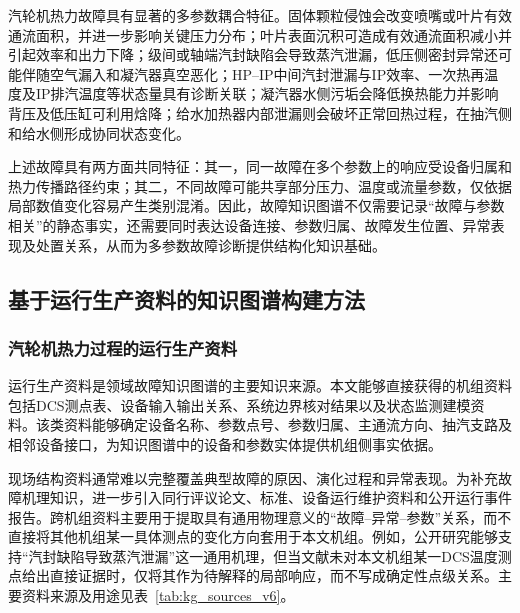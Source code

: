 汽轮机热力故障具有显著的多参数耦合特征。固体颗粒侵蚀会改变喷嘴或叶片有效通流面积，并进一步影响关键压力分布\cite{Kubiak2002TurbineDegradation}；叶片表面沉积可造成有效通流面积减小并引起效率和出力下降\cite{Kubiak2002ScaleDeposit}；级间或轴端汽封缺陷会导致蒸汽泄漏，低压侧密封异常还可能伴随空气漏入和凝汽器真空恶化\cite{ZhangHu2021FaultPropagationGNN}；HP--IP中间汽封泄漏与IP效率、一次热再温度及IP排汽温度等状态量具有诊断关联\cite{Xu2011HPIPLeakage}；凝汽器水侧污垢会降低换热能力并影响背压及低压缸可利用焓降\cite{Li2016CondenserFouling,Medica2018CondenserCondition}；给水加热器内部泄漏则会破坏正常回热过程，在抽汽侧和给水侧形成协同状态变化\cite{Heo2012FWHLeakage,Barszcz2011FeedwaterHeater}。

上述故障具有两方面共同特征：其一，同一故障在多个参数上的响应受设备归属和热力传播路径约束；其二，不同故障可能共享部分压力、温度或流量参数，仅依据局部数值变化容易产生类别混淆。因此，故障知识图谱不仅需要记录“故障与参数相关”的静态事实，还需要同时表达设备连接、参数归属、故障发生位置、异常表现及处置关系，从而为多参数故障诊断提供结构化知识基础。

\subsection{基于运行生产资料的知识图谱构建方法}
\label{subsec:kg_construction_v6}

\subsubsection{汽轮机热力过程的运行生产资料}
\label{subsubsec:operation_materials_v6}

运行生产资料是领域故障知识图谱的主要知识来源。本文能够直接获得的机组资料包括DCS测点表、设备输入输出关系、系统边界核对结果以及状态监测建模资料。该类资料能够确定设备名称、参数点号、参数归属、主通流方向、抽汽支路及相邻设备接口，为知识图谱中的设备和参数实体提供机组侧事实依据。

现场结构资料通常难以完整覆盖典型故障的原因、演化过程和异常表现。为补充故障机理知识，进一步引入同行评议论文、标准、设备运行维护资料和公开运行事件报告。跨机组资料主要用于提取具有通用物理意义的“故障--异常--参数”关系，而不直接将其他机组某一具体测点的变化方向套用于本文机组。例如，公开研究能够支持“汽封缺陷导致蒸汽泄漏”这一通用机理，但当文献未对本文机组某一DCS温度测点给出直接证据时，仅将其作为待解释的局部响应，而不写成确定性点级关系。主要资料来源及用途见表~\ref{tab:kg_sources_v6}。

